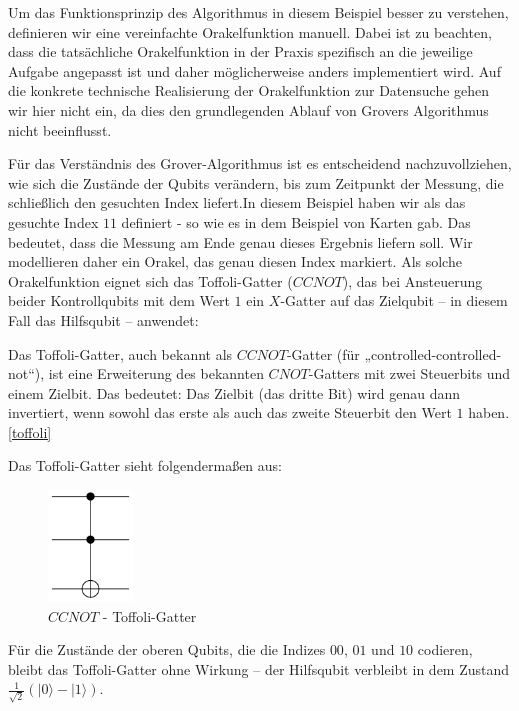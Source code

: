 Um das Funktionsprinzip des Algorithmus in diesem Beispiel besser zu verstehen, definieren wir eine vereinfachte Orakelfunktion manuell. Dabei ist zu beachten, dass die tatsächliche Orakelfunktion in der Praxis spezifisch an die jeweilige Aufgabe angepasst ist und daher möglicherweise anders implementiert wird. Auf die konkrete technische Realisierung der Orakelfunktion zur Datensuche gehen wir hier nicht ein, da dies den grundlegenden Ablauf von Grovers Algorithmus nicht beeinflusst.

Für das Verständnis des Grover-Algorithmus ist es entscheidend nachzuvollziehen, wie sich die Zustände der Qubits verändern, bis zum Zeitpunkt der Messung, die schließlich den gesuchten Index liefert.In diesem Beispiel haben wir als das gesuchte Index $11$ definiert - so wie es in dem Beispiel von Karten gab. Das bedeutet, dass die Messung am Ende genau dieses Ergebnis liefern soll. Wir modellieren daher ein Orakel, das genau diesen Index markiert. Als solche Orakelfunktion eignet sich das Toffoli-Gatter ($CCNOT$), das bei Ansteuerung beider Kontrollqubits mit dem Wert $1$ ein $X$-Gatter auf das Zielqubit – in diesem Fall das Hilfsqubit – anwendet:

\begin{definition}
\label{def:toffoli}
Das Toffoli-Gatter, auch bekannt als $CCNOT$-Gatter (für „controlled-controlled-not“), ist eine Erweiterung des bekannten $CNOT$-Gatters mit zwei Steuerbits und einem Zielbit. Das bedeutet: Das Zielbit (das dritte Bit) wird genau dann invertiert, wenn sowohl das erste als auch das zweite Steuerbit den Wert $1$ haben.\ref{toffoli}
\end{definition}

Das Toffoli-Gatter sieht folgendermaßen aus:
\begin{figure}[H]
    \centering
    \includegraphics[width=0.2\textwidth]{images/basic-algorithms/toffoli.png}
    \caption{$CCNOT$ - Toffoli-Gatter}
    \label{fig:toffoli-gate}
\end{figure}

 Für die Zustände der oberen Qubits, die die Indizes $00$, $01$ und $10$ codieren, bleibt das Toffoli-Gatter ohne Wirkung – der Hilfsqubit verbleibt in dem Zustand $\frac{1}{\sqrt{2}}(|0\rangle - |1\rangle)$.\\

